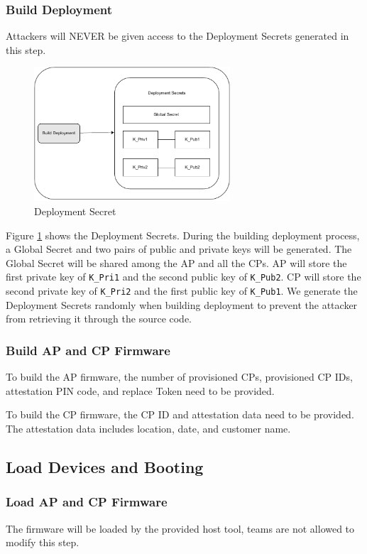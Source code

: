 \documentclass[11pt,oneside,onecolumn,letterpaper]{article}
\begin{document}
	\subsubsection{Build Deployment}
	Attackers will NEVER be given access to the Deployment Secrets generated in this step.
	\begin{figure}[h]
		\centering
		\includegraphics[width=0.65\textwidth]{pics/secret.pdf}
		\caption{Deployment Secret}
		\label{fig:secret}
	\end{figure}
	
	Figure \ref{fig:secret} shows the Deployment Secrets.
	During the building deployment process,
	a Global Secret and two pairs of public and private keys will be generated.
	The Global Secret will be shared among the AP and all the CPs.
	AP will store the first private key of \texttt{K\_Pri1} and the second public key of \texttt{K\_Pub2}.
	CP will store the second private key of \texttt{K\_Pri2} and the first public key of \texttt{K\_Pub1}.
	We generate the Deployment Secrets randomly when building deployment to prevent the attacker from retrieving it through the source code.
	
	\subsubsection{Build AP and CP Firmware}
	To build the AP firmware,
	the number of provisioned CPs,
	provisioned CP IDs,
	attestation PIN code,
	and replace Token need to be provided.
	
	To build the CP firmware,
	the CP ID and attestation data need to be provided.
	The attestation data includes location,
	date,
	and customer name.
	
	\subsection{Load Devices and Booting}
	\subsubsection{Load AP and CP Firmware}
	The firmware will be loaded by the provided host tool,
	teams are not allowed to modify this step.
	
\end{document}
